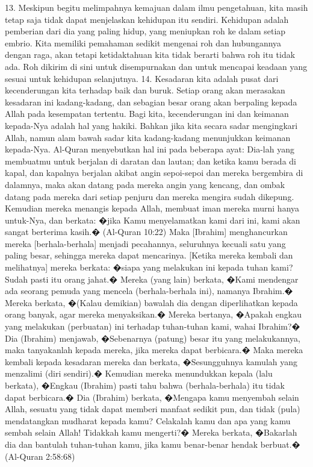 \documentclass[]{article}
\begin{document}
13. Meskipun begitu melimpahnya kemajuan dalam ilmu pengetahuan, kita masih tetap saja tidak dapat menjelaskan kehidupan itu sendiri. Kehidupan adalah pemberian dari dia yang paling hidup, yang meniupkan roh ke dalam setiap embrio. Kita memiliki pemahaman sedikit mengenai roh dan hubungannya dengan raga, akan tetapi ketidaktahuan kita tidak berarti bahwa roh itu tidak ada. Roh dikirim di sini untuk disempurnakan dan untuk mencapai keadaan yang sesuai untuk kehidupan selanjutnya.
14. Kesadaran kita adalah pusat dari kecenderungan kita terhadap baik dan buruk. Setiap orang akan merasakan kesadaran ini kadang-kadang,  dan sebagian besar orang akan berpaling kepada Allah pada kesempatan tertentu. Bagi kita, kecenderungan ini dan keimanan kepada-Nya adalah hal yang hakiki. Bahkan jika kita secara sadar mengingkari Allah,  namun alam bawah sadar kita kadang-kadang menunjukkan keimanan kepada-Nya.  Al-Quran menyebutkan hal ini pada beberapa ayat:
Dia-lah yang membuatmu untuk berjalan di daratan dan lautan; dan ketika kamu berada di kapal, dan kapalnya berjalan akibat angin sepoi-sepoi dan mereka bergembira di dalamnya, maka akan datang pada mereka angin yang kencang, dan ombak datang pada mereka dari setiap penjuru dan mereka mengira sudah dikepung. Kemudian mereka menangis kepada Allah, membuat iman mereka murni hanya untuk-Nya, dan berkata: �jika Kamu menyelamatkan kami dari ini, kami akan sangat berterima kasih.� (Al-Quran 10:22) 
Maka [Ibrahim] menghancurkan mereka [berhala-berhala] menjadi pecahannya, seluruhnya kecuali satu yang paling besar, sehingga mereka dapat mencarinya. [Ketika mereka kembali dan melihatnya] mereka berkata: �siapa yang melakukan ini kepada tuhan kami? Sudah pasti itu orang jahat.� Mereka (yang lain) berkata, �Kami mendengar ada seorang pemuda yang mencela (berhala-berhala ini), namanya Ibrahim.� Mereka berkata, �(Kalau demikian) bawalah dia dengan diperlihatkan kepada orang banyak, agar mereka menyaksikan.� Mereka bertanya, �Apakah engkau yang melakukan (perbuatan) ini terhadap tuhan-tuhan kami, wahai Ibrahim?� Dia (Ibrahim) menjawab, �Sebenarnya (patung) besar itu yang melakukannya, maka tanyakanlah kepada mereka, jika mereka dapat berbicara.� Maka mereka kembali kepada kesadaran mereka dan berkata, �Sesungguhnya kamulah yang menzalimi (diri sendiri).� Kemudian mereka menundukkan kepala (lalu berkata), �Engkau (Ibrahim) pasti tahu bahwa (berhala-berhala) itu tidak dapat berbicara.� Dia (Ibrahim) berkata, �Mengapa kamu menyembah selain Allah, sesuatu yang tidak dapat memberi manfaat sedikit pun, dan tidak (pula) mendatangkan mudharat kepada kamu? Celakalah kamu dan apa yang kamu sembah selain Allah! Tidakkah kamu mengerti?� Mereka berkata, �Bakarlah dia dan bantulah tuhan-tuhan kamu, jika kamu benar-benar hendak berbuat.� (Al-Quran 2:58:68) 
\end{document}
